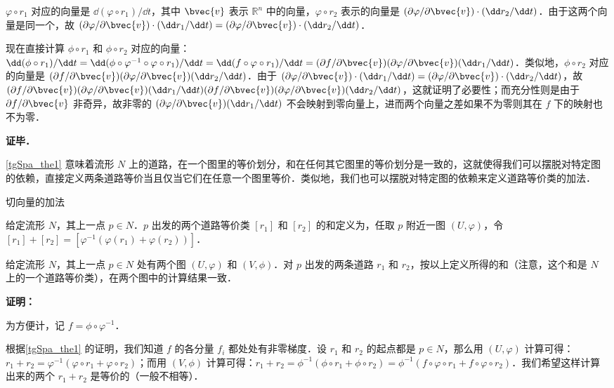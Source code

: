 $\varphi\circ r_1$ 对应的向量是 $\dd(\varphi\circ r_1)/\dd t$，其中 $\bvec{v}$ 表示 $\mathbb{R}^n$ 中的向量，$\varphi\circ r_2$ 表示的向量是 $(\partial\varphi/\partial\bvec{v})\cdot(\dd r_2/\dd t)$．由于这两个向量是同一个，故 $(\partial\varphi/\partial\bvec{v})\cdot(\dd r_1/\dd t)=(\partial\varphi/\partial\bvec{v})\cdot(\dd r_2/\dd t)$．

现在直接计算 $\phi\circ r_1$ 和 $\phi\circ r_2$ 对应的向量：$\dd(\phi\circ r_1)/\dd t=\dd(\phi\circ\varphi^{-1}\circ\varphi\circ r_1)/\dd t=\dd(f\circ\varphi\circ r_1)/\dd t=(\partial f/\partial\bvec{v})(\partial\varphi/\partial\bvec{v})(\dd r_1/\dd t)$．类似地，$\phi\circ r_2$ 对应的向量是 $(\partial f/\partial\bvec{v})(\partial\varphi/\partial\bvec{v})(\dd r_2/\dd t)$．由于 $(\partial\varphi/\partial\bvec{v})\cdot(\dd r_1/\dd t)=(\partial\varphi/\partial\bvec{v})\cdot(\dd r_2/\dd t)$，故 $(\partial f/\partial\bvec{v})(\partial\varphi/\partial\bvec{v})(\dd r_1/\dd t)(\partial f/\partial\bvec{v})(\partial\varphi/\partial\bvec{v})(\dd r_2/\dd t)$，这就证明了必要性；而充分性则是由于 $\partial f/\partial\bvec{v}$ 非奇异，故非零的 $(\partial\varphi/\partial\bvec{v})(\dd r_1/\dd t)$ 不会映射到零向量上，进而两个向量之差如果不为零则其在 $f$ 下的映射也不为零．


\textbf{证毕．}

\autoref{tgSpa_the1} 意味着流形 $N$ 上的道路，在一个图里的等价划分，和在任何其它图里的等价划分是一致的，这就使得我们可以摆脱对特定图的依赖，直接定义两条道路等价当且仅当它们在任意一个图里等价．类似地，我们也可以摆脱对特定图的依赖来定义道路等价类的加法．

\begin{definition}{切向量的加法}\label{tgSpa_def1}

给定流形 $N$，其上一点 $p\in N$．$p$ 出发的两个道路等价类 $[r_1]$ 和 $[r_2]$ 的和定义为，任取 $p$ 附近一图 $(U, \varphi)$，令 $[r_1]+[r_2]=[\varphi^{-1}(\varphi(r_1)+\varphi(r_2))]$．

\end{definition}

\begin{theorem}{}
给定流形 $N$，其上一点 $p\in N$ 处有两个图 $(U, \varphi)$ 和 $(V, \phi)$．对 $p$ 出发的两条道路 $r_1$ 和 $r_2$，按以上定义所得的和（注意，这个和是 $N$ 上的一个道路等价类），在两个图中的计算结果一致．
\end{theorem}

\textbf{证明：}

为方便计，记 $f=\phi\circ\varphi^{-1}$．

根据\autoref{tgSpa_the1} 的证明，我们知道 $f$ 的各分量 $f_i$ 都处处有非零梯度．设 $r_1$ 和 $r_2$ 的起点都是 $p\in N$，那么用 $(U, \varphi)$ 计算可得：$r_1+r_2=\varphi^{-1}(\varphi\circ r_1+\varphi\circ r_2)$；而用 $(V, \phi)$ 计算可得：$r_1+r_2=\phi^{-1}(\phi\circ r_1+\phi\circ r_2)=\phi^{-1}(f\circ\varphi\circ r_1+f\circ\varphi\circ r_2)$．我们希望这样计算出来的两个 $r_1+r_2$ 是等价的（一般不相等）．


